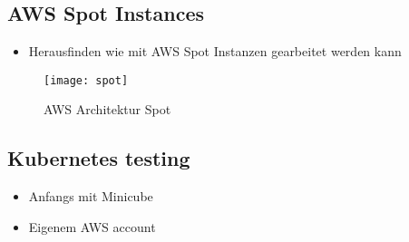 \subsection{AWS Spot Instances}
\begin{itemize}
	\item Herausfinden wie mit AWS Spot Instanzen gearbeitet werden kann
\end{itemize}
\begin{figure}[H]
	\centering
	\texttt{[image: spot]}
	\caption{AWS Architektur Spot\cite{AmazonAWSSpot:1}}
	\label{fig:AWS Architektur Spot}
\end{figure}

\subsection{Kubernetes testing}
\begin{itemize}
	\item Anfangs mit Minicube
	\item Eigenem AWS account
\end{itemize}
